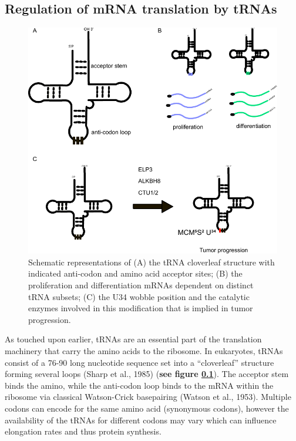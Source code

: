 \documentclass[12pt,openany]{book}
\begin{document}
\subsection{Regulation of mRNA translation by tRNAs} \label{tRNA}\begin{figure}
  \includegraphics{./figures/tRNA.pdf}
  \caption{ Schematic representations of (A) the tRNA cloverleaf structure with indicated anti-codon and amino acid acceptor sites;  (B)  the proliferation and differentiation mRNAs dependent on distinct tRNA subsets; (C) the U34 wobble position and the catalytic enzymes involved in this modification that is implied in tumor progression.
 \label{fig:tRNA}}
\end{figure}

As touched upon earlier, tRNAs are an essential part of the translation
machinery that carry the amino acids to the ribosome. In eukaryotes,
tRNAs consist of a 76-90 long nucleotide sequence set into a
``cloverleaf'' structure forming several loops (Sharp et al., 1985)
(\textbf{see figure \ref{tRNA}}). The acceptor stem binds the amino,
while the anti-codon loop binds to the mRNA within the ribosome via
classical Watson-Crick basepairing (Watson et al., 1953). Multiple
codons can encode for the same amino acid (synonymous codons), however
the availability of the tRNAs for different codons may vary which can
influence elongation rates and thus protein synthesis.
\end{document}

